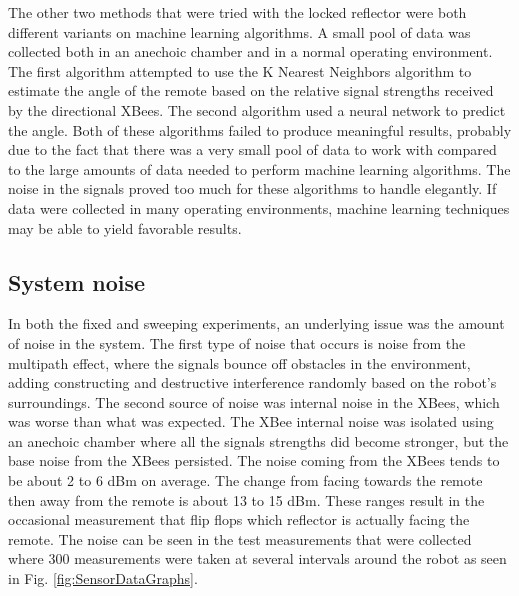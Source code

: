 \vspace*{12pt}
\noindent
The other two methods that were tried with the locked reflector were both different variants on machine learning algorithms. A small pool of data was collected both in an anechoic chamber and in a normal operating environment. The first algorithm attempted to use the K Nearest Neighbors algorithm to estimate the angle of the remote based on the relative signal strengths received by the directional XBees. The second algorithm used a neural network to predict the angle. Both of these algorithms failed to produce meaningful results, probably due to the fact that there was a very small pool of data to work with compared to the large amounts of data needed to perform machine learning algorithms. The noise in the signals proved too much for these algorithms to handle elegantly. If data were collected in many operating environments, machine learning techniques may be able to yield favorable results.

\subsection{System noise}

In both the fixed and sweeping experiments, an underlying issue was the amount of noise in the system. The first type of noise that occurs is noise from the multipath effect, where the signals bounce off obstacles in the environment, adding constructing and destructive interference randomly based on the robot's surroundings. The second source of noise was internal noise in the XBees, which was worse than what was expected. The XBee internal noise was isolated using an anechoic chamber where all the signals strengths did become stronger, but the base noise from the XBees persisted. The noise coming from the XBees tends to be about 2 to 6 dBm on average. The change from facing towards the remote then away from the remote is about 13 to 15 dBm. These ranges result in the occasional measurement that flip flops which reflector is actually facing the remote. The noise can be seen in the test measurements that were collected where 300 measurements were taken at several intervals around the robot as seen in Fig. \ref{fig:SensorDataGraphs}.

